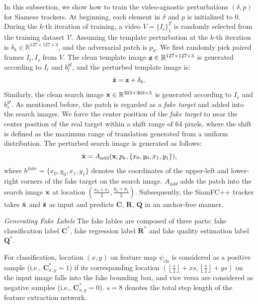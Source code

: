 \documentclass[journal]{IEEEtran}
\begin{document}
In this subsection, we show how to train the video-agnostic perturbations $(\delta, p)$ for Siamese trackers. At beginning, each element in $\delta$ and $p$ is initialized to 0.
During the $k$-th iteration of training, a video $V=\{I_i\}_1^T$ is randomly selected from the training dataset $\mathcal V$. 
Assuming the template perturbation at the $k$-th iteration is $\delta_k \in \mathbb{R}^{127\times 127 \times 3}$, and the adversarial patch is $p_k$. 
We first randomly pick paired frames $I_t, I_s$ from $V$. The clean template image $\textbf z\in \mathbb{R}^{127\times 127 \times 3}$ is generated according to $I_t$ and $b^{gt}_t$, and the perturbed template image is:
\begin{equation}
\tilde {\textbf z} = \textbf z + \delta_k.
\end{equation}
Similarly, the clean search image $\textbf x \in \mathbb{R}^{303\times 303 \times 3}$ is generated according to $I_s$ and $b^{gt}_s$.
As mentioned before, the patch is regarded as a \textit{fake target} and added into the search images. We force the center position of the \textit{fake target} to near the center position of the real target within a shift range of 64 pixels, where the shift is defined as the maximum range of translation generated from a uniform distribution.
The perturbed search image is generated as follows:
\begin{equation}
\tilde{\textbf x} = A_{\text{add}}(\textbf x, p_k, \{x_0, y_0, x_1, y_1\}),
\end{equation}
where $ b^{fake} = \{x_0, y_0, x_1, y_1\}$ denotes the coordinates of the upper-left and lower-right corners of the fake target on the search image. 
\uline{$A_{add}$} adds the patch into the search image $\textbf x$ at location $(\frac{x_0+x_1}{2},\frac{y_0+y_1}{2})$. Subsequently, the SiamFC++ tracker takes $\tilde {\textbf x}$ and $\tilde{\textbf z}$ as input and predicts $\textbf{C, R, Q}$ in an anchor-free manner.

\textit{Generating Fake Labels} The fake lables are composed of three parts: fake classification label $\textbf{C}^*$, fake regression label $\textbf{R}^*$ and fake quality estimation label $\textbf{Q}^*$.

For classification, location $(x,y)$ on feature map $\psi_{\mathrm{cls}}$ is considered as a positive sample (i.e., $\textbf{C}^*_{x,y} = 1$) if its corresponding location $\left(\left\lfloor\frac{s}{2}\right\rfloor+x s,\left\lfloor\frac{s}{2}\right\rfloor+y s\right)$ on the input image falls into the fake bounding box, and vice versa are considered as negative samples (i.e., $\textbf{C}^*_{x,y} = 0$). $s=8$ denotes the total step length of the feature extraction network.
\end{document}
